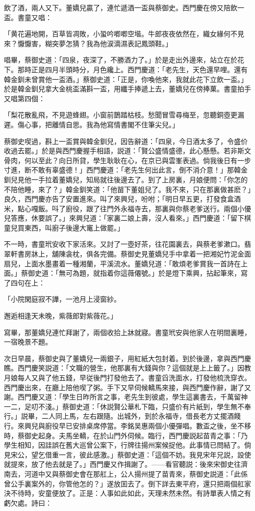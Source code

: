 飲了酒，兩人又下。董嬌兒贏了，連忙遞酒一盃與蔡御史。西門慶在傍又陪飲一盃。書童又唱：

「黄花遍地開，百草皆凋敗，小蛩吟喞喞空堦。牛郎夜夜依然在，織女緣何不見來？懨懨害，糊突夢怎猜？我為他涙滴濕表記鳳頭鞋。」

唱畢，蔡御史道：「四泉，夜深了，不勝酒力了。」於是走出外邊來，站立在於花下。那時正是四月半頭時分，月色纔上。西門慶道：「老先生，天色還早哩。還有韓金釧未曾賞他一盃酒。」蔡御史道：「正是，你喚他來，我就此花下立飲一盃。」於是韓金釧兒拿大金桃盃滿斟一盃，用纖手捧遞上去，董嬌兒在傍捧菓。書童拍手又唱第四個：

「梨花散亂飛，不見遊蜂翅。小窗前鵲踏枯枝。愁聞冒雪尋梅至，忽聽銅壺更漏遲。傷心事，把離情自思。我為他寫情書閣不住筆尖兒。」

蔡御史喫過，斟上一盃賞與韓金釧兒，因告辭道：「四泉，今日酒太多了，令盛价收過去罷。」於是與西門慶握手相語，説道：「賢公盛情盛德，此心懸懸。若非斯文骨肉，何以至此？向日所貸，學生耿耿在心，在京已與雲峯表過。倘我後日有一步寸進，断不敢有辜盛德！」西門慶道：「老先生何出此言，倒不消介意！」那韓金釧兒見他一手拉着董嬌兒，知局就往後邊去了。到了上房裏，月娘便問：「你怎的不陪他睡，來了？」韓金釧笑道：「他㽞下董姐兒了。我不來，只在那裏做甚麽？」良久，西門慶亦告了安置進來。叫了來興兒，吩咐；「明日早五更，打發食盒酒米，點心嘎飯。呌了廚役，跟了往門外永福寺去，那裏與你蔡老爹送行。兩個小優兒答應，休要誤了。」來興兒道：「家裏二娘上壽，沒人看來。」西門慶道：「留下棋童兒買東西，叫廚子後邊大竃上做罷。」

不一時，書童玳安收下家活來。又討了一壺好茶，往花園裏去，與蔡老爹漱口。翡翠軒書房牀上，舖陳衾枕，俱各完備。蔡御史見董嬌兒手中拿着一把湘妃竹泥金面扇兒，上面水墨畫着一種湘蘭，平溪流水。董嬌兒道：「敢煩老爹賞我一首詩在上面。」蔡御史道：「無可為題，就指着你這薇僊號。」於是燈下乘興，拈起筆來，寫了四句在上：

「小院閑庭寂不譁，一池月上浸窗紗。

邂逅相逢天未晚，紫薇郎對紫薇花。」

寫畢，那董嬌兒連忙拜謝了，兩個收拾上牀就寢。書童玳安與他家人在明間裏睡，一宿晚景不題。

次日早晨，蔡御史與了董嬌兒一兩銀子，用紅紙大包封着。到於後邊，拿與西門慶瞧。西門慶笑説道：「文職的營生，他那裏有大錢與你？這個就是上上籤了。」因教月娘每人又與了他五錢，早従後門打發他去了。書童舀洗面水，打發他梳洗穿衣。西門慶出來，在廳上陪他喫了粥。手下又早伺候轎馬來接，與西門慶作辭，謝了又謝。西門慶又道：「學生日昨所言之事，老先生到彼處，學生這裏書去，千萬留神一二，足叨不淺。」蔡御史道：「休説賢公華札下臨，只盛价有片紙到，學生無不奉行。」説畢，二人同上馬，左右跟隨。出城外，到於永福寺，借長老方丈擺酒餞行。來興兒與廚役早已安排桌席停當。李銘吴惠兩個小優彈唱。數盃之後，坐不移時，蔡御史起身。夫馬坐轎，在於山門外伺候。臨行，西門慶説起苗青之事：「乃學生相知，因詿誤在舊大巡曾公案下，行牌往揚州案候捉他。此事情已問結了。倘見宋公，望乞借重一言，彼此感激。」蔡御史道：「這個不妨。我見宋年兄説，設使就提來，放了他去就是了。」西門慶又作揖謝了。——看官聽説：後來宋御史往濟南去，河道中又與蔡御史會在那舡上，公人揚州提了苗青來，蔡御史説道：「此係曾公手裏案外的，你管他怎的？」遂放囬去了。倒下詳去東平府，還只把兩個舡家決不待時，安童便放了。正是：人事如此如此，天理未然未然。有詩單表人情之有虧欠處。詩曰：

